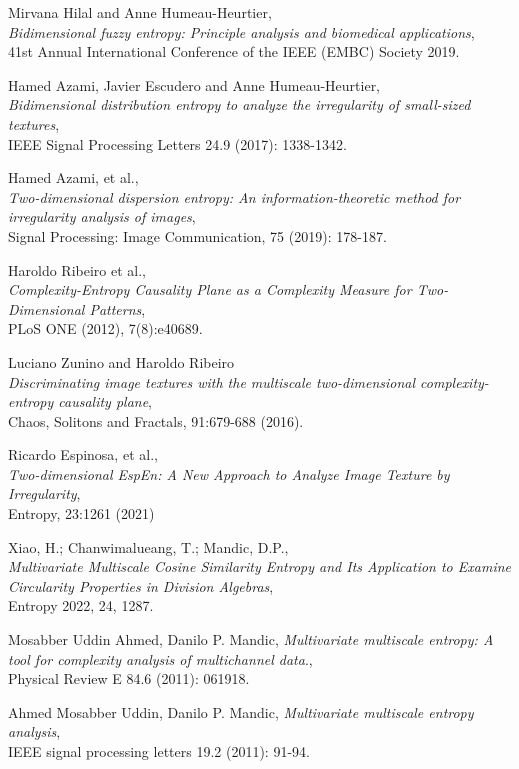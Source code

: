 \documentclass[12pt, a4paper, titlepage, openany]{book}
\begin{document}
\begin{thebibliography}{9}
Mirvana Hilal and Anne Humeau-Heurtier,\\
\emph{Bidimensional fuzzy entropy: Principle analysis and biomedical applications},\\
41st Annual International Conference of the IEEE (EMBC) Society 2019.

Hamed Azami, Javier Escudero and Anne Humeau-Heurtier,\\
\emph{Bidimensional distribution entropy to analyze the irregularity of small-sized textures},\\
IEEE Signal Processing Letters 24.9 (2017): 1338-1342.

Hamed Azami, et al.,\\
\emph{Two-dimensional dispersion entropy: An information-theoretic method for irregularity analysis of images},\\
Signal Processing: Image Communication, 75 (2019): 178-187.

Haroldo Ribeiro et al.,\\
\emph{Complexity-Entropy Causality Plane as a Complexity Measure for Two-Dimensional Patterns},\\
PLoS ONE (2012), 7(8):e40689.

Luciano Zunino and Haroldo Ribeiro\\
\emph{Discriminating image textures with the multiscale two-dimensional complexity-entropy causality plane},\\
Chaos, Solitons and Fractals,  91:679-688 (2016).

Ricardo Espinosa, et al.,\\
\emph{Two-dimensional EspEn: A New Approach to Analyze Image Texture by Irregularity},\\
Entropy, 23:1261 (2021)

Xiao, H.; Chanwimalueang, T.; Mandic, D.P., \\
\emph{Multivariate Multiscale Cosine Similarity Entropy and Its Application to Examine Circularity Properties in Division Algebras},\\
Entropy 2022, 24, 1287. 

Mosabber Uddin Ahmed, Danilo P. Mandic, 
\emph{Multivariate multiscale entropy: A tool for complexity analysis of multichannel data}.,\\
Physical Review E 84.6 (2011): 061918.

Ahmed Mosabber Uddin, Danilo P. Mandic, 
\emph{Multivariate multiscale entropy analysis},\\
IEEE signal processing letters 19.2 (2011): 91-94.


\end{thebibliography}
\end{document}
